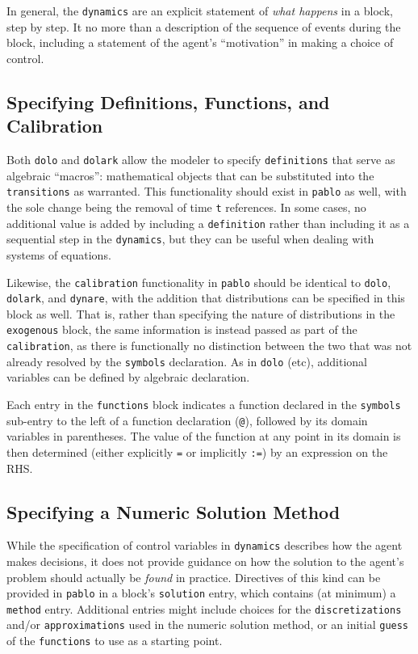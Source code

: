 \documentclass[12pt,pdftex,letterpaper]{article}
\begin{document}
In general, the \texttt{dynamics} are an explicit statement of \textit{what happens} in a block, step by step. It no more than a description of the sequence of events during the block, including a statement of the agent's ``motivation'' in making a choice of control.


\subsection{Specifying Definitions, Functions, and Calibration}

Both \texttt{dolo} and \texttt{dolark} allow the modeler to specify \texttt{definitions} that serve as algebraic ``macros'': mathematical objects that can be substituted into the \texttt{transitions} as warranted. This functionality should exist in \texttt{pablo} as well, with the sole change being the removal of time \texttt{t} references. In some cases, no additional value is added by including a \texttt{definition} rather than including it as a sequential step in the \texttt{dynamics}, but they can be useful when dealing with systems of equations.

Likewise, the \texttt{calibration} functionality in \texttt{pablo} should be identical to \texttt{dolo}, \texttt{dolark}, and \texttt{dynare}, with the addition that distributions can be specified in this block as well. That is, rather than specifying the nature of distributions in the \texttt{exogenous} block, the same information is instead passed as part of the \texttt{calibration}, as there is functionally no distinction between the two that was not already resolved by the \texttt{symbols} declaration. As in \texttt{dolo} (etc), additional variables can be defined by algebraic declaration.

Each entry in the \texttt{functions} block indicates a function declared in the \texttt{symbols} sub-entry to the left of a function declaration (\texttt{@}), followed by its domain variables in parentheses. The value of the function at any point in its domain is then determined (either explicitly \texttt{=} or implicitly \texttt{:=}) by an expression on the RHS.


\subsection{Specifying a Numeric Solution Method}

While the specification of control variables in \texttt{dynamics} describes how the agent makes decisions, it does not provide guidance on how the solution to the agent's problem should actually be \textit{found} in practice. Directives of this kind can be provided in \texttt{pablo} in a block's \texttt{solution} entry, which contains (at minimum) a \texttt{method} entry. Additional entries might include choices for the \texttt{discretizations} and/or \texttt{approximations} used in the numeric solution method, or an initial \texttt{guess} of the \texttt{functions} to use as a starting point.
\end{document}

